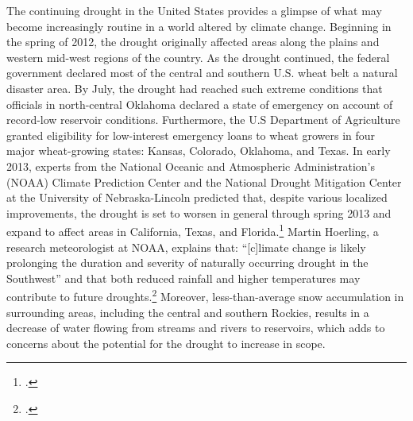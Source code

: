 \documentclass[10pt]{article}
\begin{document}
The continuing drought in the United States provides a glimpse of what may become increasingly routine in a world altered by climate change.
Beginning in the spring of 2012, the drought originally affected areas along the plains and western mid-west regions of the country. 
As the drought continued, the federal government declared most of the central and southern U.S. wheat belt a natural disaster area. 
By July, the drought had reached such extreme conditions that officials in north-central Oklahoma declared a state of emergency on account of record-low reservoir conditions. 
Furthermore, the U.S Department of Agriculture granted eligibility for low-interest emergency loans to wheat growers in four major wheat-growing states: Kansas, Colorado, Oklahoma, and Texas. 
In early 2013, experts from the National Oceanic and Atmospheric Administration's (NOAA) Climate Prediction Center and the National Drought Mitigation Center at the University of Nebraska-Lincoln predicted that, despite various localized improvements, the drought is set to worsen in general through spring 2013 and expand to affect areas in California, Texas, and Florida.\footcite[][]{NOAAteleconf2013}
Martin Hoerling, a research meteorologist at NOAA, explains that: ``[c]limate change is likely prolonging the duration and severity of naturally occurring drought in the Southwest'' and that both reduced rainfall and higher temperatures may contribute to future droughts.\footcite[][]{USHeatAndDrought}
Moreover, less-than-average snow accumulation in surrounding areas, including the central and southern Rockies, results in a decrease of water flowing from streams and rivers to reservoirs, which adds to concerns about the potential for the drought to increase in scope.
\end{document}
